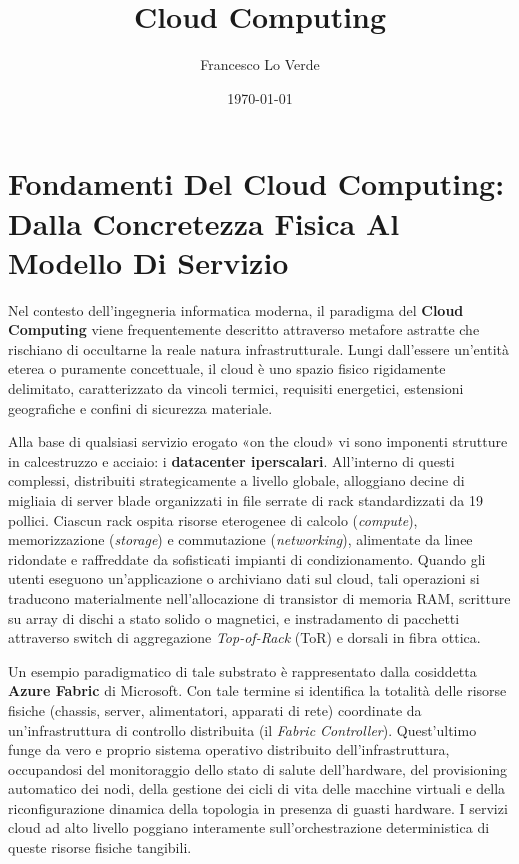 \documentclass[11pt, a4paper]{article}
\title{Cloud Computing}
\date{\today}
\author{Francesco Lo Verde}
\begin{document}
\maketitle

\section{Fondamenti Del Cloud Computing: Dalla Concretezza Fisica Al Modello Di Servizio}

Nel contesto dell'ingegneria informatica moderna, il paradigma del \textbf{Cloud Computing} viene frequentemente descritto attraverso metafore astratte che rischiano di occultarne la reale natura infrastrutturale. Lungi dall'essere un'entità eterea o puramente concettuale, il cloud è uno spazio fisico rigidamente delimitato, caratterizzato da vincoli termici, requisiti energetici, estensioni geografiche e confini di sicurezza materiale.

Alla base di qualsiasi servizio erogato «on the cloud» vi sono imponenti strutture in calcestruzzo e acciaio: i \textbf{datacenter iperscalari}. All'interno di questi complessi, distribuiti strategicamente a livello globale, alloggiano decine di migliaia di server blade organizzati in file serrate di rack standardizzati da 19 pollici. Ciascun rack ospita risorse eterogenee di calcolo (\emph{compute}), memorizzazione (\emph{storage}) e commutazione (\emph{networking}), alimentate da linee ridondate e raffreddate da sofisticati impianti di condizionamento. Quando gli utenti eseguono un'applicazione o archiviano dati sul cloud, tali operazioni si traducono materialmente nell'allocazione di transistor di memoria RAM, scritture su array di dischi a stato solido o magnetici, e instradamento di pacchetti attraverso switch di aggregazione \emph{Top-of-Rack} (ToR) e dorsali in fibra ottica.

Un esempio paradigmatico di tale substrato è rappresentato dalla cosiddetta \textbf{Azure Fabric} di Microsoft. Con tale termine si identifica la totalità delle risorse fisiche (chassis, server, alimentatori, apparati di rete) coordinate da un'infrastruttura di controllo distribuita (il \emph{Fabric Controller}). Quest'ultimo funge da vero e proprio sistema operativo distribuito dell'infrastruttura, occupandosi del monitoraggio dello stato di salute dell'hardware, del provisioning automatico dei nodi, della gestione dei cicli di vita delle macchine virtuali e della riconfigurazione dinamica della topologia in presenza di guasti hardware. I servizi cloud ad alto livello poggiano interamente sull'orchestrazione deterministica di queste risorse fisiche tangibili.
\end{document}
